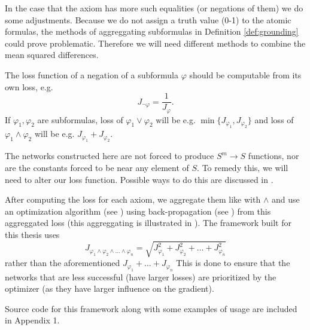 In the case that the axiom has more such equalities (or negations of them) we do some adjustments. Because we do not assign a truth value (0-1) to the atomic formulas, the methods of aggreggating subformulas in Definition \autoref{def:grounding} could prove problematic. Therefore we will need different methods to combine the mean squared differences.

The loss function of a negation of a subformula $\varphi$ should be computable from its own loss, e.g. $$J_{\neg\varphi}=\frac{1}{J_{\varphi}}.$$ If $\varphi_1,\varphi_2$ are subformulas, loss of $\varphi_1\vee \varphi_2$ will be e.g. $\min\{J_{\varphi_1},J_{\varphi_2}\}$ and loss of $\varphi_1\wedge \varphi_2$ will be e.g. $J_{\varphi_1}+J_{\varphi_2}$.

The networks constructed here are not forced to produce $S^m\rightarrow S$ functions, nor are the constants forced to be near any element of $S$. To remedy this, we will need to alter our loss function. Possible ways to do this are discussed in .

After computing the loss for each axiom, we aggregate them like with $\wedge$ and use an optimization algorithm (see ) using back-propagation (see ) from this aggreggated loss (this aggreggating is illustrated in ). The framework built for this thesis uses $$J_{\varphi_1\wedge\varphi_2\wedge\dots\wedge\varphi_n}=\sqrt{J_{\varphi_1}^2+J_{\varphi_2}^2+\dots+J_{\varphi_n}^2}$$ rather than the aforementioned $J_{\varphi_1}+\dots+J_{\varphi_n}$ This is done to ensure that the networks that are less successful (have larger losses) are prioritized by the optimizer (as they have larger influence on the gradient).

Source code for this framework along with some examples of usage are included in Appendix 1.

